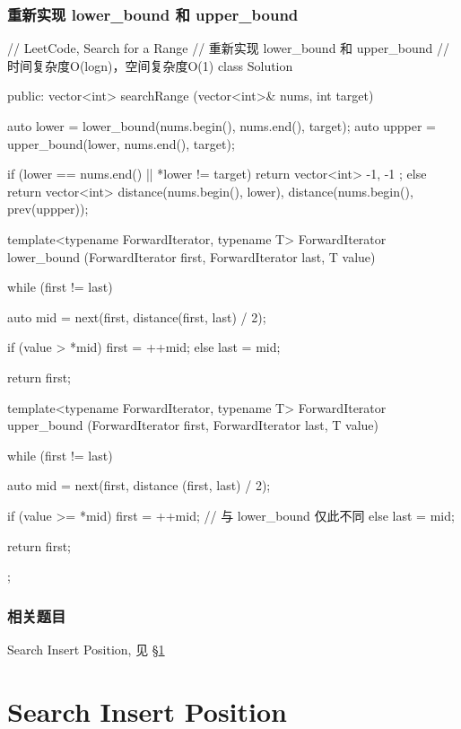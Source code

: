 \subsubsection{重新实现 lower_bound 和 upper_bound}
\begin{Code}
// LeetCode, Search for a Range
// 重新实现 lower_bound 和 upper_bound
// 时间复杂度O(logn)，空间复杂度O(1)
class Solution {
public:
    vector<int> searchRange (vector<int>& nums, int target) {
        auto lower = lower_bound(nums.begin(), nums.end(), target);
        auto uppper = upper_bound(lower, nums.end(), target);

        if (lower == nums.end() || *lower != target)
            return vector<int> { -1, -1 };
        else
            return vector<int> {distance(nums.begin(), lower), distance(nums.begin(), prev(uppper))};
    }

    template<typename ForwardIterator, typename T>
    ForwardIterator lower_bound (ForwardIterator first,
            ForwardIterator last, T value) {
        while (first != last) {
            auto mid = next(first, distance(first, last) / 2);

            if (value > *mid)   first = ++mid;
            else                last = mid;
        }

        return first;
    }

    template<typename ForwardIterator, typename T>
    ForwardIterator upper_bound (ForwardIterator first,
            ForwardIterator last, T value) {
        while (first != last) {
            auto mid = next(first, distance (first, last) / 2);

            if (value >= *mid)   first = ++mid;  // 与 lower_bound 仅此不同
            else                 last = mid;
        }

        return first;
    }
};
\end{Code}

\subsubsection{相关题目}
\begindot
\item Search Insert Position, 见 \S \ref{sec:search-insert-position}
\myenddot


\section{Search Insert Position} %
\label{sec:search-insert-position}


